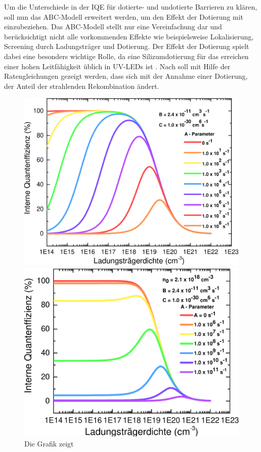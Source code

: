Um die Unterschiede in der IQE für dotierte- und undotierte Barrieren zu klären, soll nun das ABC-Modell erweitert werden, um den Effekt der Dotierung mit einzubeziehen. 
Das ABC-Modell stellt nur eine Vereinfachung dar und berücksichtigt nicht alle vorkommenden Effekte wie beispielsweise Lokalisierung, Screening durch Ladungsträger und Dotierung. 
Der Effekt der Dotierung spielt dabei eine besonders wichtige Rolle, da eine Silizumdotierung für das erreichen einer hohen Leitfähigkeit üblich in UV-LEDs ist \cite{doi:10.1063/1.1492316}.
Nach \cite{schub} soll mit Hilfe der Ratengleichungen gezeigt werden, dass sich mit der Annahme einer Dotierung,
der Anteil der strahlenden Rekombination ändert.
\newline
\begin{figure}[H]
    \centering
    \begin{minipage}[t]{0.49\linewidth}
        \centering
        \includegraphics[width=\linewidth]{Bilder/IQEohneDotierungVerschAParams.pdf}
        \caption{Die Grafik zeigt}
        \label{fig:iqenorm}
    \end{minipage}%
    \hfill
    \begin{minipage}[t]{0.49\linewidth}
        \centering
        \includegraphics[width=\linewidth]{Bilder/IQEmitDotierungVerschAParams.pdf}

\end{minipage}
\end{figure}
